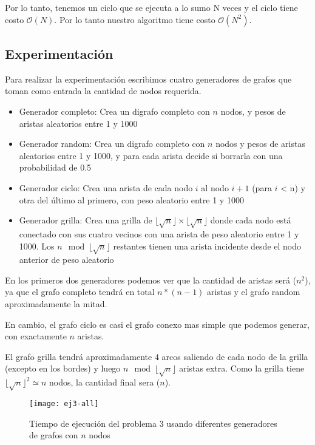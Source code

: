 Por lo tanto, tenemos un ciclo que se ejecuta a lo sumo N veces y el ciclo tiene costo $\mathcal{O}(N)$. Por lo tanto nuestro algoritmo tiene costo $\mathcal{O}(N^{2})$.

\subsection{Experimentación}

Para realizar la experimentación escribimos cuatro generadores de grafos que toman como entrada la cantidad de nodos requerida.

\begin{itemize}

    \item Generador completo: Crea un digrafo completo con $n$ nodos, y pesos de aristas aleatorios entre 1 y 1000

    \item Generador random: Crea un digrafo completo con $n$ nodos y pesos de aristas aleatorios entre 1 y 1000, y para cada arista decide si borrarla con una probabilidad de 0.5

    \item Generador ciclo: Crea una arista de cada nodo $i$ al nodo $i+1$ (para $i$ < n) y otra del último al primero, con peso aleatorio entre 1 y 1000

    \item Generador grilla: Crea una grilla de $\lfloor \sqrt{n} \rfloor \times \lfloor \sqrt{n} \rfloor$ donde cada nodo está conectado con sus cuatro vecinos con una arista de peso aleatorio entre 1 y 1000. Los $n \mod \lfloor \sqrt{n} \rfloor$ restantes tienen una arista incidente desde el nodo anterior de peso aleatorio

\end{itemize}

En los primeros dos generadores podemos ver que la cantidad de aristas será \bigo($n^2$), ya que el grafo completo tendrá en total $n * (n-1)$ aristas y el grafo random aproximadamente la mitad.

En cambio, el grafo ciclo es casi el grafo conexo mas simple que podemos generar, con exactamente $n$ aristas.

El grafo grilla tendrá aproximadamente $4$ arcos saliendo de cada nodo de la grilla (excepto en los bordes) y luego $n \mod \lfloor \sqrt{n} \rfloor$ aristas extra. Como la grilla tiene $\lfloor \sqrt{n} \rfloor^2 \simeq n$ nodos, la cantidad final sera \bigo($n$).

    \begin{figure}[H]
    	\centering
    	\texttt{[image: ej3-all]}
    	\caption{Tiempo de ejecución del problema 3 usando diferentes generadores de grafos con $n$ nodos}
    	\label{fig:ej3-all}
    \end{figure}

